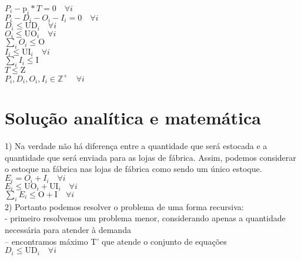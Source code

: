 \documentclass{book}
\begin{document}
$P_i - \textrm{p}_i * T  = 0 \quad \forall i$ \\

$P_i - D_i - O_i - I_i = 0 \quad \forall i$ \\

$D_i \leq \textrm{UD}_i \quad \forall i$ \\

$O_i \leq \textrm{UO}_i \quad \forall i$ \\

$\sum_i{O_i} \leq \textrm{O}$ \\

$I_i \leq \textrm{UI}_i \quad \forall i$ \\

$\sum_i{I_i} \leq \textrm{I}$ \\

$T \leq \textrm{Z}$ \\

$P_i, D_i, O_i, I_i \in  \mathbb{Z}^+ \quad \forall i$


\section{Solução analítica e matemática}

1) Na verdade não há diferença entre a quantidade que será estocada e a quantidade que será enviada para as lojas de fábrica. Assim, podemos considerar o estoque na fábrica nas lojas de fábrica como sendo um único estoque. \\

$E_i = O_i + I_i \quad \forall i $ \\

$E_i \leq \textrm{UO}_i + \textrm{UI}_i \quad \forall i$ \\

$\sum_i{E_i} \leq \textrm{O} + \textrm{I} \quad \forall i$ \\

2) Portanto podemos resolver o problema de uma forma recursiva: \\

 - primeiro resolvemos um problema menor, considerando apenas a quantidade necessária para atender à demanda \\
 
 		-- encontramos máximo T' que atende o conjunto de equações \\
 		
 		$D_i \leq \textrm{UD}_i \quad \forall i$ \\
 		
\end{document}
